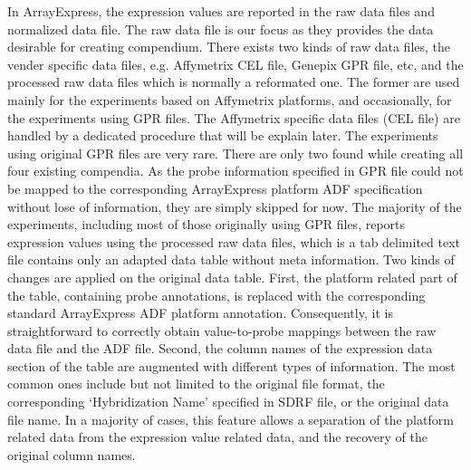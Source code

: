In ArrayExpress, the expression values are reported in the raw data files
and normalized data file.
%
The raw data file is our focus as they provides the data desirable for
creating compendium.
%
There exists two kinds of raw data files, the vender specific data files,
e.g. Affymetrix CEL file, Genepix GPR file, etc, and the processed raw
data files which is normally a reformated one.
%
%
The former are used mainly for the experiments based on Affymetrix platforms,
and occasionally, for the experiments using GPR files.
%
The Affymetrix specific data files (CEL file) are handled by a dedicated
procedure that will be explain later.
%
The experiments using original GPR files are very rare.  There are only
two found while creating all four existing compendia.  As the probe
information specified in GPR file could not be mapped to the
corresponding ArrayExpress platform ADF specification without lose of
information, they are simply skipped for now.
%
%
%
The majority of the experiments, including most of those originally using
GPR files, reports expression values using the processed raw data files,
which is a tab delimited text file contains only an adapted data table
without meta information.
%
Two kinds of changes are applied on the original data table.  First, the
platform related part of the table, containing probe annotations, is replaced
with the corresponding standard ArrayExpress ADF platform annotation.
%
Consequently, it is straightforward to correctly obtain value-to-probe
mappings between the raw data file and the ADF file.
%
Second, the column names of the expression data section of the table are
augmented with different types of information.  The most common ones include
but not limited to the original file format, the corresponding `Hybridization
Name' specified in SDRF file, or the original data file name.
%
In a majority of cases, this feature allows a separation of the platform
related data from the expression value related data, and the recovery of the
original column names.


